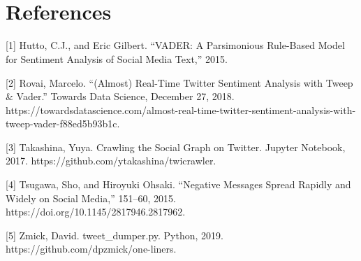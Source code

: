 \documentclass[11pt]{article}
\begin{document}
\section{\\References}

[1] Hutto, C.J., and Eric Gilbert. “VADER: A Parsimonious Rule-Based Model for Sentiment Analysis of Social Media Text,” 2015.\newline

[2] Rovai, Marcelo. “(Almost) Real-Time Twitter Sentiment Analysis with Tweep \& Vader.” Towards Data Science, December 27, 2018. https://towardsdatascience.com/almost-real-time-twitter-sentiment-analysis-with-tweep-vader-f88ed5b93b1c.\newline

[3] Takashina, Yuya. Crawling the Social Graph on Twitter. Jupyter Notebook, 2017.\newline
https://github.com/ytakashina/twicrawler.\newline

[4] Tsugawa, Sho, and Hiroyuki Ohsaki. “Negative Messages Spread Rapidly and Widely on Social Media,” 151–60, 2015. https://doi.org/10.1145/2817946.2817962.\newline

[5] Zmick, David. tweet\_dumper.py. Python, 2019. https://github.com/dpzmick/one-liners.
\end{document}
